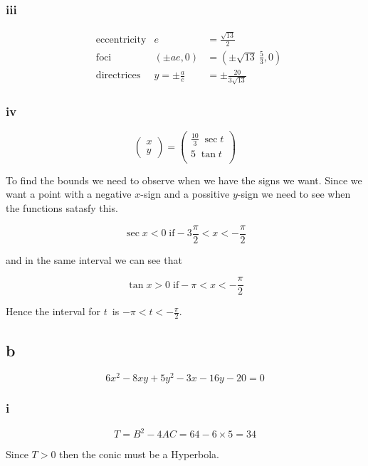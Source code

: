 \documentclass{article}
\begin{document}
\subsubsection{iii}

\begin{align*}
	 & \mathrm{eccentricity} & e               & = \frac {\sqrt {13}}2            \\
	 & \mathrm{foci}         & (\pm ae, 0)     & = (\pm\sqrt {13}~ \frac {5} 3,0) \\
	 & \mathrm{directrices}  & y = \pm\frac ae & = \pm \frac {20} {3\sqrt {13}}
\end{align*}

\subsubsection{iv}

$$
	\begin{pmatrix}
		x \\ y
	\end{pmatrix}
	=
	\begin{pmatrix}
		\frac {10}3\; \sec t \\
		5       \;\tan t     \\
	\end{pmatrix}
$$

To find the bounds we need to observe when we have the signs we want. Since we want a point with a negative $x$-sign and a possitive $y$-sign we need to see when the functions satasfy this.

$$\sec x < 0 \;\mathrm{if} -3\frac \pi 2 < x < - \frac \pi 2$$

and in the same interval we can see that

$$\tan x > 0 \;\mathrm{if} -\pi < x < - \frac \pi 2$$

Hence the interval for $t$ is $-\pi < t < - \frac \pi 2$.

\subsection{b}

$$6x^2 - 8xy + 5y^2 - 3x - 16y - 20 = 0$$

\subsubsection{i}

$$T = B^2 - 4 AC = 64 - 6 \times 5 = 34$$

Since $T > 0$ then the conic must be a Hyperbola.
\end{document}
